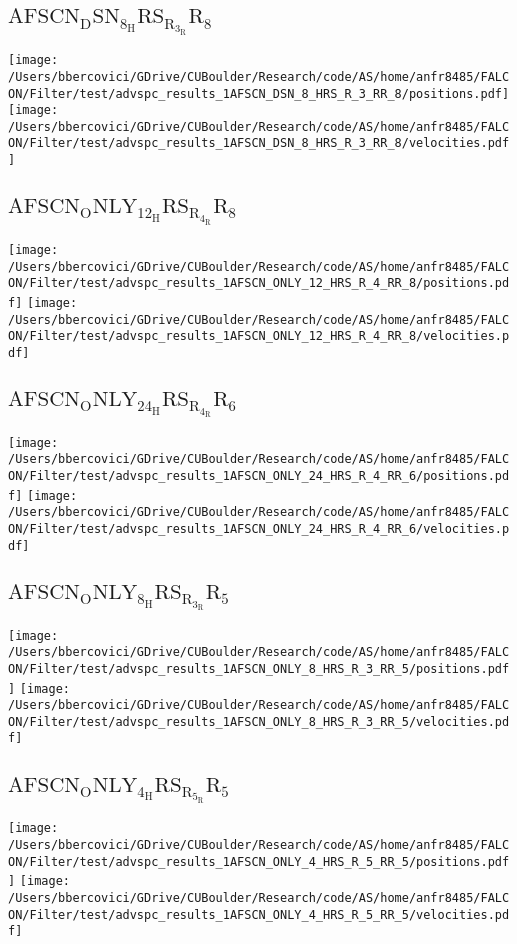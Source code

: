 \subsection{$\mathrm{AFSCN_DSN_8_HRS_R_3_RR_8}$}
\texttt{[image: /Users/bbercovici/GDrive/CUBoulder/Research/code/AS/home/anfr8485/FALCON/Filter/test/advspc\_results\_1AFSCN\_DSN\_8\_HRS\_R\_3\_RR\_8/positions.pdf]}
\texttt{[image: /Users/bbercovici/GDrive/CUBoulder/Research/code/AS/home/anfr8485/FALCON/Filter/test/advspc\_results\_1AFSCN\_DSN\_8\_HRS\_R\_3\_RR\_8/velocities.pdf]}
\subsection{$\mathrm{AFSCN_ONLY_12_HRS_R_4_RR_8}$}
\texttt{[image: /Users/bbercovici/GDrive/CUBoulder/Research/code/AS/home/anfr8485/FALCON/Filter/test/advspc\_results\_1AFSCN\_ONLY\_12\_HRS\_R\_4\_RR\_8/positions.pdf]}
\texttt{[image: /Users/bbercovici/GDrive/CUBoulder/Research/code/AS/home/anfr8485/FALCON/Filter/test/advspc\_results\_1AFSCN\_ONLY\_12\_HRS\_R\_4\_RR\_8/velocities.pdf]}
\subsection{$\mathrm{AFSCN_ONLY_24_HRS_R_4_RR_6}$}
\texttt{[image: /Users/bbercovici/GDrive/CUBoulder/Research/code/AS/home/anfr8485/FALCON/Filter/test/advspc\_results\_1AFSCN\_ONLY\_24\_HRS\_R\_4\_RR\_6/positions.pdf]}
\texttt{[image: /Users/bbercovici/GDrive/CUBoulder/Research/code/AS/home/anfr8485/FALCON/Filter/test/advspc\_results\_1AFSCN\_ONLY\_24\_HRS\_R\_4\_RR\_6/velocities.pdf]}
\subsection{$\mathrm{AFSCN_ONLY_8_HRS_R_3_RR_5}$}
\texttt{[image: /Users/bbercovici/GDrive/CUBoulder/Research/code/AS/home/anfr8485/FALCON/Filter/test/advspc\_results\_1AFSCN\_ONLY\_8\_HRS\_R\_3\_RR\_5/positions.pdf]}
\texttt{[image: /Users/bbercovici/GDrive/CUBoulder/Research/code/AS/home/anfr8485/FALCON/Filter/test/advspc\_results\_1AFSCN\_ONLY\_8\_HRS\_R\_3\_RR\_5/velocities.pdf]}
\subsection{$\mathrm{AFSCN_ONLY_4_HRS_R_5_RR_5}$}
\texttt{[image: /Users/bbercovici/GDrive/CUBoulder/Research/code/AS/home/anfr8485/FALCON/Filter/test/advspc\_results\_1AFSCN\_ONLY\_4\_HRS\_R\_5\_RR\_5/positions.pdf]}
\texttt{[image: /Users/bbercovici/GDrive/CUBoulder/Research/code/AS/home/anfr8485/FALCON/Filter/test/advspc\_results\_1AFSCN\_ONLY\_4\_HRS\_R\_5\_RR\_5/velocities.pdf]}

